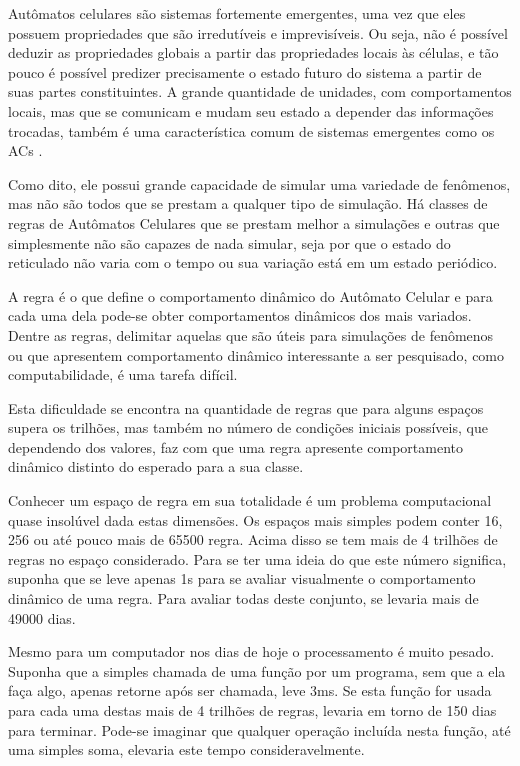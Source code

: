 \documentclass[12pt,a4paper]{report}
\begin{document}
	Autômatos celulares são sistemas fortemente emergentes, uma vez que eles possuem propriedades que são irredutíveis e imprevisíveis. Ou seja, não é possível deduzir as propriedades globais a partir das propriedades locais às células, e tão pouco é possível predizer precisamente o estado futuro do sistema a partir de suas partes constituintes. A grande quantidade de unidades, com comportamentos locais, mas que se comunicam e mudam seu estado a depender das informações trocadas, também é uma característica comum de sistemas emergentes como os ACs \cite{Klaus2002}.
	
	Como dito, ele possui grande capacidade de simular uma variedade de fenômenos, mas não são todos que se prestam a qualquer tipo de simulação. Há classes de regras de Autômatos Celulares que se prestam melhor a simulações e outras que simplesmente não são capazes de nada simular, seja por que o estado do reticulado não varia com o tempo ou sua variação está em um estado periódico.
	
	A regra é o que define o comportamento dinâmico do Autômato Celular e para cada uma dela pode-se obter comportamentos dinâmicos dos mais variados. Dentre as regras, delimitar aquelas que são úteis para simulações de fenômenos ou que apresentem comportamento dinâmico interessante a ser pesquisado, como computabilidade, é uma tarefa difícil.
	
	Esta dificuldade se encontra na quantidade de regras que para alguns espaços supera os trilhões, mas também no número de condições iniciais possíveis, que dependendo dos valores, faz com que uma regra apresente comportamento dinâmico distinto do esperado para a sua classe.
	
	Conhecer um espaço de regra em sua totalidade é um problema computacional quase insolúvel dada estas dimensões. Os espaços mais simples podem conter 16, 256 ou até pouco mais de 65500 regra. Acima disso se tem mais de 4 trilhões de regras no espaço considerado. Para se ter uma ideia do que este número significa, suponha que se leve apenas 1s para se avaliar visualmente o comportamento dinâmico de uma regra. Para avaliar todas deste conjunto, se levaria mais de 49000 dias.
	
	Mesmo para um computador nos dias de hoje o processamento é muito pesado. Suponha que a simples chamada de uma função por um programa, sem que a ela faça algo, apenas retorne após ser chamada, leve 3ms. Se esta função for usada para cada uma destas mais de 4 trilhões de regras, levaria em torno de 150 dias para terminar. Pode-se imaginar que qualquer operação incluída nesta função, até uma simples soma, elevaria este tempo consideravelmente.
	
\end{document}
